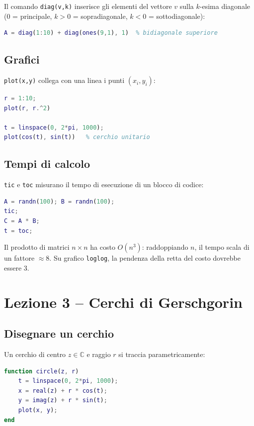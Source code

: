 \documentclass[12pt,a4paper,]{report}
\begin{document}
Il comando \texttt{diag(v,k)} inserisce gli elementi del vettore $v$ sulla
$k$-esima diagonale (0 = principale, $k>0$ = sopradiagonale, $k<0$ = sottodiagonale):
\begin{lstlisting}[language=Matlab]
A = diag(1:10) + diag(ones(9,1), 1)  % bidiagonale superiore
\end{lstlisting}

\subsection{Grafici}

\texttt{plot(x,y)} collega con una linea i punti $(x_i, y_i)$:
\begin{lstlisting}[language=Matlab]
r = 1:10;
plot(r, r.^2)

t = linspace(0, 2*pi, 1000);
plot(cos(t), sin(t))   % cerchio unitario
\end{lstlisting}

\subsection{Tempi di calcolo}

\texttt{tic} e \texttt{toc} misurano il tempo di esecuzione di un blocco di codice:
\begin{lstlisting}[language=Matlab]
A = randn(100); B = randn(100);
tic;
C = A * B;
t = toc;
\end{lstlisting}
Il prodotto di matrici $n \times n$ ha costo $O(n^3)$: raddoppiando $n$,
il tempo scala di un fattore $\approx 8$.
Su grafico \texttt{loglog}, la pendenza della retta del costo dovrebbe essere 3.


\section{Lezione 3 -- Cerchi di Gerschgorin}

\subsection{Disegnare un cerchio}

Un cerchio di centro $z \in \mathbb{C}$ e raggio $r$ si traccia parametricamente:
\begin{lstlisting}[language=Matlab]
function circle(z, r)
    t = linspace(0, 2*pi, 1000);
    x = real(z) + r * cos(t);
    y = imag(z) + r * sin(t);
    plot(x, y);
end
\end{lstlisting}
\end{document}
